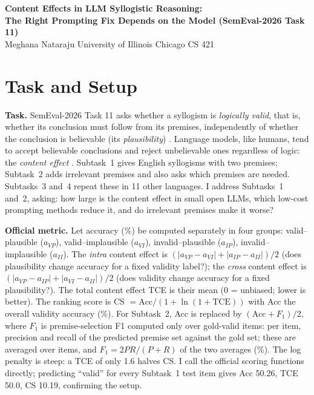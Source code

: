 \documentclass[11pt,letterpaper]{article}
\begin{document}
\begin{center}
{\large\bfseries Content Effects in LLM Syllogistic Reasoning:\\ The Right Prompting Fix Depends on the Model (SemEval-2026 Task 11)}\\[3pt]
Meghana Nataraju \quad University of Illinois Chicago \quad CS 421 
\end{center}

\section{Task and Setup}
\textbf{Task.} SemEval-2026 Task 11 asks whether a syllogism is \emph{logically valid}, that is, whether its conclusion must follow from its premises, independently of whether the conclusion is believable (its \emph{plausibility}) \cite{valentino}. Language models, like humans, tend to accept believable conclusions and reject unbelievable ones regardless of logic: the \emph{content effect} \cite{dasgupta}. Subtask~1 gives English syllogisms with two premises; Subtask~2 adds irrelevant premises and also asks which premises are needed. Subtasks~3 and~4 repeat these in 11 other languages. I address Subtasks~1 and~2, asking: how large is the content effect in small open LLMs, which low-cost prompting methods reduce it, and do irrelevant premises make it worse?

\textbf{Official metric.} Let accuracy (\%) be computed separately in four groups: valid--plausible ($a_{VP}$), valid--implausible ($a_{VI}$), invalid--plausible ($a_{IP}$), invalid--implausible ($a_{II}$). The \emph{intra} content effect is $(|a_{VP}-a_{VI}| + |a_{IP}-a_{II}|)/2$ (does plausibility change accuracy for a fixed validity label?); the \emph{cross} content effect is $(|a_{VP}-a_{IP}| + |a_{VI}-a_{II}|)/2$ (does validity change accuracy for a fixed plausibility?). The total content effect TCE is their mean (0 = unbiased; lower is better). The ranking score is CS $= \mathrm{Acc} / (1 + \ln(1 + \mathrm{TCE}))$ with Acc the overall validity accuracy (\%). For Subtask~2, Acc is replaced by $(\mathrm{Acc} + F_1)/2$, where $F_1$ is premise-selection F1 computed only over gold-valid items: per item, precision and recall of the predicted premise set against the gold set; these are averaged over items, and $F_1 = 2PR/(P+R)$ of the two averages (\%). The log penalty is steep: a TCE of only 1.6 halves CS. I call the official scoring functions directly; predicting ``valid'' for every Subtask~1 test item gives Acc 50.26, TCE 50.0, CS 10.19, confirming the setup.
\end{document}

